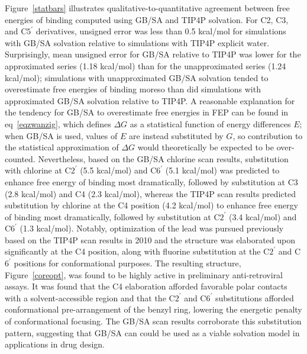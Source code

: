 \documentclass[12pt]{report}
\def\figlab{Figure}\def\figslab{\figlab s}
\def\equlab{eq}\def\equslab{Eqs.}
\newcommand*\eq[1]{\equlab~\ref{#1}}
\newcommand*\fig[1]{\figlab~\ref{#1}}
\begin{document}
\fig{statbars} illustrates qualitative-to-quantitative agreement between free energies of binding computed using GB/SA and TIP4P solvation. For C2, C3, and C$5^\prime$ derivatives, unsigned error was less than 0.5 kcal/mol for simulations with GB/SA solvation relative to simulations with TIP4P explicit water. Surprisingly, mean unsigned error for GB/SA relative to TIP4P was lower for the approximated series (1.18 kcal/mol) than for the unapproximated series (1.24 kcal/mol); simulations with unapproximated GB/SA solvation tended to overestimate free energies of binding moreso than did simulations with approximated GB/SA solvation relative to TIP4P. A reasonable explanation for the tendency for GB/SA to overestimate free energies in FEP can be found in \eq{eqzwanzig}, which defines $\Delta G$ as a statistical function of energy differences $E$; when GB/SA is used, values of $E$ are instead substituted by $G$, so contribution to the statistical approximation of $\Delta G$ would theoretically be expected to be over-counted. Nevertheless, based on the GB/SA chlorine scan results, substitution with chlorine at C$2^\prime$ (5.5 kcal/mol) and C$6^\prime$ (5.1 kcal/mol) was predicted to enhance free energy of binding most dramatically, followed by substitution at C3 (2.8 kcal/mol) and C4 (2.3 kcal/mol), whereas the TIP4P scan results predicted substitution by chlorine at the C4 position (4.2 kcal/mol) to enhance free energy of binding most dramatically, followed by substitution at C$2^\prime$ (3.4 kcal/mol) and C$6^\prime$ (1.3 kcal/mol). Notably, optimization of the lead was pursued previously\cite{tipopt} based on the TIP4P scan results in 2010\cite{tipscan} and the structure was elaborated upon significantly at the C4 position, along with fluorine substitution at the C$2^\prime$ and C$6^\prime$ positions for conformational purposes. The resulting structure, \fig{coreopt}, was found to be highly active in preliminary anti-retroviral assays. It was found\cite{tipopt} that the C4 elaboration afforded favorable polar contacts with a solvent-accessible region and that the C$2^\prime$ and C$6^\prime$ substitutions afforded conformational pre-arrangement of the benzyl ring, lowering the energetic penalty of conformational focusing. The GB/SA scan results corroborate this substitution pattern, suggesting that GB/SA can could be used as a viable solvation model in applications in drug design.
\end{document}
